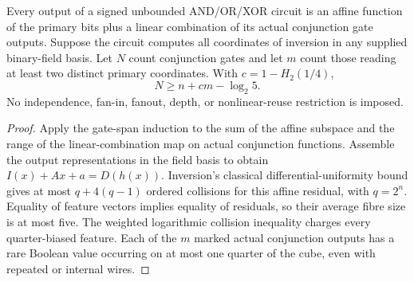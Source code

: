 \begin{lemma}
  \label{lem:lowerbounds-algebraic-geometry-inversion-features}
  \leanok
  Every output of a signed unbounded AND/OR/XOR circuit is an affine function
  of the primary bits plus a linear combination of its actual conjunction
  gate outputs. Suppose the circuit computes all coordinates of inversion
  in any supplied binary-field basis. Let $N$ count conjunction gates and
  let $m$ count those reading at least two distinct primary coordinates.
  With $c=1-H_2(1/4)$,
  \[
    N\ge n+cm-\log_2 5.
  \]
  No independence, fan-in, fanout, depth, or nonlinear-reuse restriction is imposed.
\end{lemma}
\begin{proof}
  \leanok
  Apply the gate-span induction to the sum of the affine subspace and the
  range of the linear-combination map on actual conjunction functions.
  Assemble the output representations in the field basis to obtain
  $I(x)+Ax+a=D(h(x))$. Inversion's classical differential-uniformity bound
  gives at most $q+4(q-1)$ ordered collisions for this affine residual,
  with $q=2^n$. Equality of feature vectors implies equality of residuals,
  so their average fibre size is at most five. The weighted logarithmic
  collision inequality charges every quarter-biased feature. Each of the
  $m$ marked actual conjunction outputs has a rare Boolean value occurring
  on at most one quarter of the cube, even with repeated or internal wires.
\end{proof}

